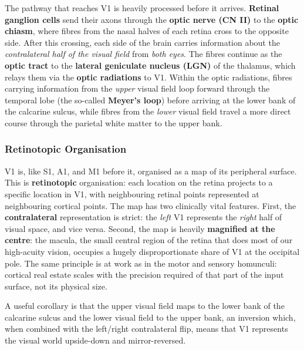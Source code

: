 \documentclass[11pt]{article}
\begin{document}
The pathway that reaches V1 is heavily processed before it arrives. \textbf{Retinal ganglion cells} send their axons through the \textbf{optic nerve (CN II)} to the \textbf{optic chiasm}, where fibres from the nasal halves of each retina cross to the opposite side. After this crossing, each side of the brain carries information about the \textit{contralateral half of the visual field} from \textit{both eyes}. The fibres continue as the \textbf{optic tract} to the \textbf{lateral geniculate nucleus (LGN)} of the thalamus, which relays them via the \textbf{optic radiations} to V1. Within the optic radiations, fibres carrying information from the \textit{upper} visual field loop forward through the temporal lobe (the so-called \textbf{Meyer's loop}) before arriving at the lower bank of the calcarine sulcus, while fibres from the \textit{lower} visual field travel a more direct course through the parietal white matter to the upper bank.

\subsubsection{Retinotopic Organisation}

V1 is, like S1, A1, and M1 before it, organised as a map of its peripheral surface. This is \textbf{retinotopic} organisation: each location on the retina projects to a specific location in V1, with neighbouring retinal points represented at neighbouring cortical points. The map has two clinically vital features. First, the \textbf{contralateral} representation is strict: the \textit{left} V1 represents the \textit{right} half of visual space, and vice versa. Second, the map is heavily \textbf{magnified at the centre}: the macula, the small central region of the retina that does most of our high-acuity vision, occupies a hugely disproportionate share of V1 at the occipital pole. The same principle is at work as in the motor and sensory homunculi: cortical real estate scales with the precision required of that part of the input surface, not its physical size.

A useful corollary is that the upper visual field maps to the lower bank of the calcarine sulcus and the lower visual field to the upper bank, an inversion which, when combined with the left/right contralateral flip, means that V1 represents the visual world upside-down and mirror-reversed.
\end{document}
